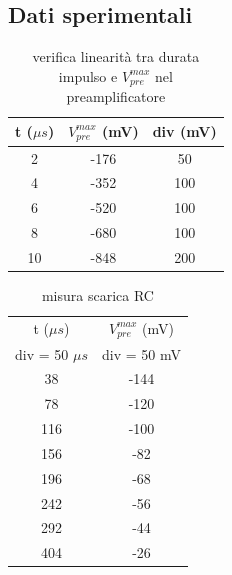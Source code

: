 \documentclass{article}
\begin{document}
\subsection{Dati sperimentali}

\begin{table}[H]
    \centering
    \begin{tabular}{ccc}
        \toprule
        t ($\mu s$) & $V_{pre}^{max}$ (mV) & div (mV) \\
        \midrule
        2 & -176 & 50 \\
        4 & -352 & 100 \\
        6 & -520 & 100 \\
        8 & -680 & 100 \\
        10 & -848 & 200 \\
        \bottomrule
    \end{tabular}
    \caption{verifica linearità tra durata impulso e $V_{pre}^{max}$ nel preamplificatore}
\end{table}

\begin{table}[H]
    \centering
    \begin{tabular}{cc}
        \toprule
        t ($\mu s$)& $V_{pre}^{max}$ (mV) \\
        div = 50 $\mu s$ & div = 50 mV\\
        \midrule
        38 & -144 \\
        78 & -120 \\
        116 & -100 \\
        156 & -82 \\
        196 & -68 \\
        242 & -56 \\
        292 & -44 \\
        404 & -26 \\
        \bottomrule
    \end{tabular}
    \caption{misura scarica RC}
\end{table}
\end{document}
